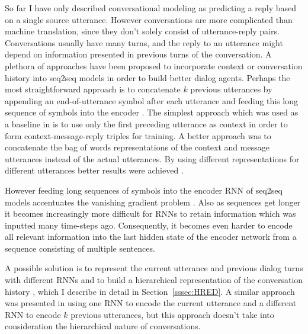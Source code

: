 \documentclass[12pt]{article}
\begin{document}
So far I have only described conversational modeling as predicting a reply based on a single source utterance. However conversations are more complicated than machine translation, since they don't solely consist of utterance-reply pairs. Conversations usually have many turns, and the reply to an utterance might depend on information presented in previous turns of the conversation. A plethora of approaches have been proposed to incorporate context or conversation history into seq2seq models in order to build better dialog agents. Perhaps the most straightforward approach is to concatenate \(k\) previous utterances by appending an end-of-utterance symbol after each utterance and feeding this long sequence of symbols into the encoder \cite{Vinyals:2015}. The simplest approach which was used as a baseline in \cite{Sordoni:2015} is to use only the first preceding utterance as context in order to form context-message-reply triples for training. A better approach was to concatenate the bag of words representations of the context and message utterances instead of the actual utterances. By using different representations for different utterances better results were achieved \cite{Sordoni:2015}.

However feeding long sequences of symbols into the encoder RNN of seq2seq models accentuates the vanishing gradient problem \cite{Hochreiter:1998}. Also as sequences get longer it becomes increasingly more difficult for RNNs to retain information which was inputted many time-steps ago. Consequently, it becomes even harder to encode all relevant information into the last hidden state of the encoder network from a sequence consisting of multiple sentences.

A possible solution is to represent the current utterance and previous dialog turns with different RNNs and to build a hierarchical representation of the conversation history \cite{Serban:2015}, which I describe in detail in Section~\ref{sssec:HRED}. A similar approach was presented in \cite{Zhaob:2017} using one RNN to encode the current utterance and a different RNN to encode \(k\) previous utterances, but this approach doesn't take into consideration the hierarchical nature of conversations.
 
\end{document}
